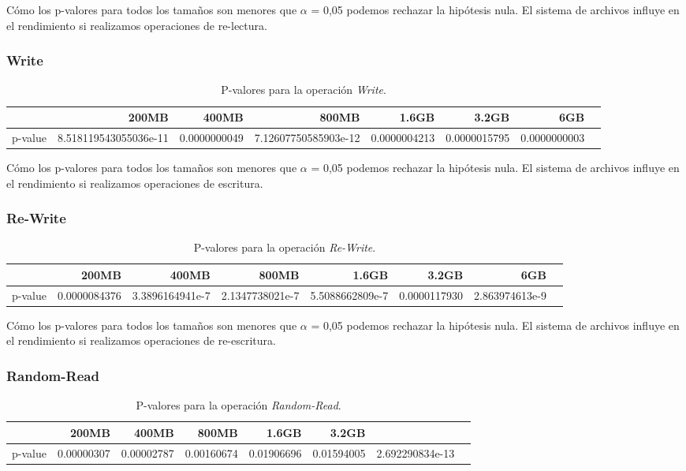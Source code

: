 Cómo los p-valores para todos los tamaños son menores que $\alpha$ = 0,05 podemos rechazar la hipótesis nula. El sistema de archivos influye en el rendimiento si realizamos operaciones de re-lectura. 


\subsubsection{Write}
\begin{table}[!htp]\centering
\scriptsize
\begin{tabular}{lrrrrrrr}\toprule
&200MB &400MB &800MB &1.6GB &3.2GB &6GB \\\midrule
p-value &8.518119543055036e-11 &0.0000000049 &7.12607750585903e-12 &0.0000004213 &0.0000015795 &0.0000000003 \\
\bottomrule
\end{tabular}
\caption{P-valores para la operación \textit{Write}.}\label{tab: }
\end{table}

Cómo los p-valores para todos los tamaños son menores que $\alpha$ = 0,05 podemos rechazar la hipótesis nula. El sistema de archivos influye en el rendimiento si realizamos operaciones de escritura. 
 \newpage
\subsubsection{Re-Write}
\begin{table}[!htp]\centering
\scriptsize
\begin{tabular}{lrrrrrrr}\toprule
&200MB &400MB &800MB &1.6GB &3.2GB &6GB \\\midrule
p-value &0.0000084376 &3.3896164941e-7 &2.1347738021e-7 &5.5088662809e-7 &0.0000117930 &2.863974613e-9 \\
\bottomrule
\end{tabular}
\caption{P-valores para la operación \textit{Re-Write}.}\label{tab: }
\end{table}

Cómo los p-valores para todos los tamaños son menores que $\alpha$ = 0,05 podemos rechazar la hipótesis nula. El sistema de archivos influye en el rendimiento si realizamos operaciones de re-escritura. 

\subsubsection{Random-Read}
\begin{table}[!htp]\centering
\scriptsize
\begin{tabular}{lrrrrrrr}\toprule
&200MB &400MB &800MB &1.6GB &3.2GB \\\midrule
p-value &0.00000307 &0.00002787 &0.00160674 &0.01906696 &0.01594005 &2.692290834e-13 \\
\bottomrule
\end{tabular}
\caption{P-valores para la operación \textit{Random-Read}.}\label{tab: }
\end{table}

